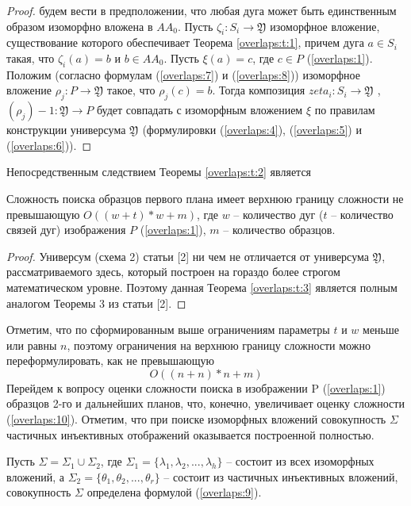 \begin{proof}
будем вести в предположении, что любая дуга  может быть единственным образом изоморфно вложена в  $AA_0$. Пусть $\zeta_i : S_i  \to \mathfrak{Y}$ изоморфное вложение, существование которого  обеспечивает Теорема \ref{overlaps:t:1}, причем дуга $a \in S_i$ такая, что $\zeta_i (a) = b$  и   $b \in AA_0$.  Пусть $\xi(a) = c$,  где  $c \in P$  (\ref{overlaps:1}).  
Положим  (согласно формулам (\ref{overlaps:7})  и  (\ref{overlaps:8}))  изоморфное вложение $\rho_j : P \to \mathfrak{Y}$  такое, что  $\rho_j (c) = b$. Тогда   композиция  $zeta_i : S_i \to \mathfrak{Y}$ , $(\rho_j)-1 : \mathfrak{Y} \to P$  будет  совпадать с  изоморфным вложением $\xi$ по правилам конструкции универсума  $\mathfrak{Y}$  (формулировки   (\ref{overlaps:4}), (\ref{overlaps:5}) и  (\ref{overlaps:6})).
\end{proof}

Непосредственным следствием Теоремы \ref{overlaps:t:2} является

\begin{theorem}
Сложность поиска образцов первого плана имеет верхнюю границу сложности не превышающую  $O((w+t)*w+m)$,  где  $w$ -- количество дуг ($t$ -- количество связей дуг) изображения  $P$  (\ref{overlaps:1}), $m$ -- количество образцов.
\label{overlaps:t:3}
\end{theorem}
\begin{proof}
Универсум (схема 2) статьи [2] ни чем не отличается от универсума  $\mathfrak{Y}$, рассматриваемого здесь, который построен на гораздо более строгом математическом уровне. Поэтому данная Теорема \ref{overlaps:t:3}  является полным аналогом Теоремы 3 из статьи [2].
\end{proof}

Отметим, что по сформированным выше ограничениям параметры  $t$  и $w$  меньше или равны $n$,  поэтому  ограничения на верхнюю границу сложности можно переформулировать, как не превышающую  
\begin{equation}
O((n+n)*n+m)
\label{overlaps:10}
\end{equation}
Перейдем к вопросу оценки сложности поиска в  изображении  P  (\ref{overlaps:1})  образцов 2-го и дальнейших планов, что, конечно, увеличивает оценку сложности (\ref{overlaps:10}).  Отметим, что при поиске изоморфных вложений совокупность $\Sigma$ частичных инъективных отображений  оказывается построенной полностью.

Пусть $\Sigma = \Sigma_1 \cup \Sigma_2$, где $\Sigma_1  =  \{\lambda_1, \lambda_2 ,... , \lambda_h \}$ -- состоит из всех изоморфных вложений,  а  $\Sigma_2  =  \{\theta_1, \theta_2 ,..., \theta_r\}$ -- состоит из частичных инъективных вложений, совокупность  $\Sigma$  определена формулой (\ref{overlaps:9}).  

